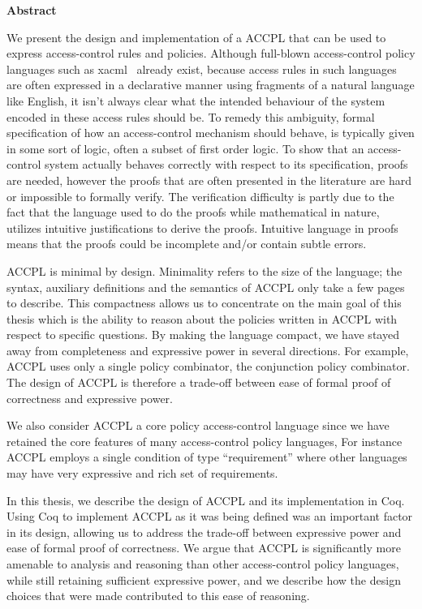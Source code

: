 
\begin{center}\textbf{Abstract}\end{center}

We present the design and implementation of a \ac{ACCPL} that can be used to express access-control rules and policies. Although full-blown access-control policy languages such as \ac{xacml}~\cite{xacml} already exist, because access rules in such languages are often expressed in a declarative manner using fragments of a natural language like English, it isn't always clear what the intended behaviour of the system encoded in these access rules should be. To remedy this ambiguity, formal specification of how an access-control mechanism should behave, is typically given in some sort of logic, often a subset of first order logic. To show that an access-control system actually behaves correctly with respect to its specification, proofs are needed, however the proofs that are often presented in the literature are hard or impossible to formally verify. The verification difficulty is partly due to the fact that the language used to do the proofs while mathematical in nature, utilizes intuitive justifications to derive the proofs. Intuitive language in proofs means that the proofs could be incomplete and/or contain subtle errors.

\ac{ACCPL} is minimal by design. Minimality refers to the size of the language; the syntax, auxiliary definitions and the semantics of \ac{ACCPL} only take a few pages to describe. This compactness allows us to concentrate on the main goal of this thesis which is the ability to reason about the policies written in \ac{ACCPL} with respect to specific questions. By making the language compact, we have stayed away from completeness and expressive power in several directions. For example, \ac{ACCPL} uses only a single policy combinator, the conjunction policy combinator. The design of \ac{ACCPL} is therefore a trade-off between ease of formal proof of correctness and expressive power.

We also consider \ac{ACCPL} a core policy access-control language since we have retained the core features of many access-control policy languages, For instance \ac{ACCPL} employs a single condition of type ``requirement'' where other languages may have very expressive and rich set of requirements. 

In this thesis, we describe the design of ACCPL and its implementation in Coq.  Using Coq to implement ACCPL as it was being defined was an important factor in its design, allowing us to address the trade-off between expressive power and ease of formal proof of correctness. We argue that \ac{ACCPL} is significantly more amenable to analysis and reasoning than other access-control policy languages, while still retaining sufficient expressive power, and we describe how the design choices that were made contributed to this ease of reasoning. 

